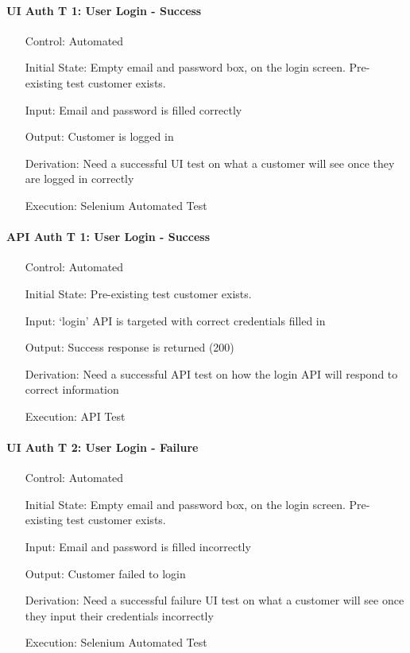 \documentclass[12pt, titlepage]{article}
\begin{document}
\paragraph*{UI Auth T 1: User Login - Success}
\begin{itemize}
	\item[Control:] Automated
	\item[Initial State:] Empty email and password box, on the login screen. Pre-existing test customer exists.
	\item[Input:] Email and password is filled correctly
	\item[Output:] Customer is logged in
	\item[Derivation:] Need a successful UI test on what a customer will see once they are logged in correctly
	\item[Execution:] Selenium Automated Test
\end{itemize}

\paragraph*{API Auth T 1: User Login - Success}
\begin{itemize}
	\item[Control:] Automated
	\item[Initial State:] Pre-existing test customer exists.
	\item[Input:] `login' API is targeted with correct credentials filled in
	\item[Output:] Success response is returned (200)
	\item[Derivation:] Need a successful API test on how the login API will respond to correct information
	\item[Execution:] API Test
\end{itemize}

\paragraph*{UI Auth T 2: User Login - Failure}
\begin{itemize}
	\item[Control:] Automated
	\item[Initial State:] Empty email and password box, on the login screen. Pre-existing test customer exists.
	\item[Input:] Email and password is filled incorrectly
	\item[Output:] Customer failed to login
	\item[Derivation:] Need a successful failure UI test on what a customer will see once they input their credentials incorrectly
	\item[Execution:] Selenium Automated Test
\end{itemize}
\end{document}

